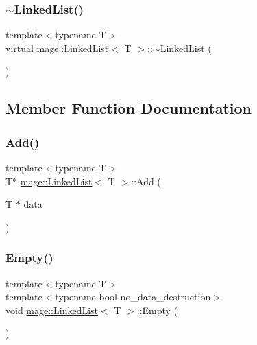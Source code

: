 \hypertarget{classmage_1_1_linked_list_a88cb2ec52e90f3658d9735b4948cccdb}{}\label{classmage_1_1_linked_list_a88cb2ec52e90f3658d9735b4948cccdb} 
\subsubsection{\texorpdfstring{$\sim$\+Linked\+List()}{~LinkedList()}}
{\footnotesize\ttfamily template$<$typename T$>$ \\
virtual \hyperlink{classmage_1_1_linked_list}{mage\+::\+Linked\+List}$<$ T $>$\+::$\sim$\hyperlink{classmage_1_1_linked_list}{Linked\+List} (\begin{DoxyParamCaption}{ }\end{DoxyParamCaption})\hspace{0.3cm}{\ttfamily [virtual]}}



\subsection{Member Function Documentation}
\hypertarget{classmage_1_1_linked_list_ac6cd236aab89f296d3c112c05b2337e2}{}\label{classmage_1_1_linked_list_ac6cd236aab89f296d3c112c05b2337e2} 
\subsubsection{\texorpdfstring{Add()}{Add()}}
{\footnotesize\ttfamily template$<$typename T$>$ \\
T$\ast$ \hyperlink{classmage_1_1_linked_list}{mage\+::\+Linked\+List}$<$ T $>$\+::Add (\begin{DoxyParamCaption}\item[{T $\ast$}]{data }\end{DoxyParamCaption})}

\hypertarget{classmage_1_1_linked_list_a6f57c11ad87c0f6d8f6ae8e785431c39}{}\label{classmage_1_1_linked_list_a6f57c11ad87c0f6d8f6ae8e785431c39} 
\subsubsection{\texorpdfstring{Empty()}{Empty()}}
{\footnotesize\ttfamily template$<$typename T$>$ \\
template$<$typename bool no\+\_\+data\+\_\+destruction$>$ \\
void \hyperlink{classmage_1_1_linked_list}{mage\+::\+Linked\+List}$<$ T $>$\+::Empty (\begin{DoxyParamCaption}{ }\end{DoxyParamCaption})}

